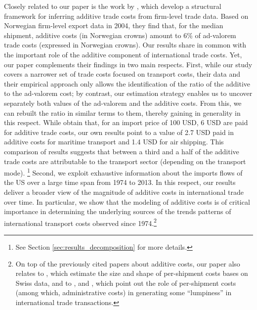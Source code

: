 \documentclass[a4paper,11pt]{article}
\begin{document}
Closely related to our paper is the work by \citet{Irrazabal_2015}, which develop a structural framework for inferring additive trade costs from firm-level trade data. Based on Norwegian firm-level export data in 2004, they find that, for the median shipment, additive costs (in Norwegian crowns) amount to 6\% of ad-valorem trade costs (expressed in Norwegian crowns). Our results share in common with \citet{Irrazabal_2015} the important role of the additive component of international trade costs. Yet, our paper complements their findings in two main respects. First, while our study covers a narrower set of trade costs focused on transport costs, their data and their empirical approach only allows the identification of the ratio of the additive to the ad-valorem cost; by contrast, our estimation strategy enables us to uncover separately both values of the ad-valorem and the additive costs. From this, we can rebuilt the ratio in similar terms to them, thereby gaining in generality in this respect. While \citet{Irrazabal_2015} obtain that, for an import price of 100 USD, 6 USD are paid for additive trade costs, our own results point to a value of 2.7 USD paid in additive costs for maritime transport and 1.4 USD for air shipping. This comparison of results suggests that between a third and a half of the additive trade costs are attributable to the transport sector (depending on the transport mode). \footnote{See Section \ref{sec:results_decomposition} for more details.} Second, we exploit exhaustive information about the imports flows of the US over a large time span from 1974 to 2013. In this respect, our results deliver a broader view of the magnitude of additive costs in international trade over time. In particular, we show that the modeling of additive costs is of critical importance in determining the underlying sources of the trends patterns of international transport costs observed since 1974.\footnote{On top of the previously cited papers about additive costs, our paper also relates to \citet{Kropf-Saure-JIE-2016}, which estimate the size and shape of per-shipment costs bases on Swiss data, and to \citet{Alessandria-et-al-AER-2010}, \citet{Hornok-et-al-RES-2015} and \citet{Hornok-et-al-JIE-2015}, which point out the role of per-shipment costs (among which, administrative costs) in generating some ``lumpiness'' in international trade transactions.} \smallskip

\end{document}
